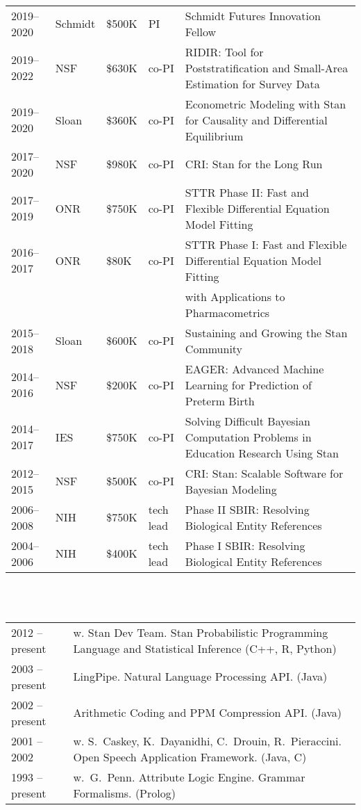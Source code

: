 \documentclass[10pt]{paper}
\newcommand{\heading}[1]{\noindent{\Large\bf\sffamily #1}\\[6pt]}
\newcommand{\publ}[2]{#1 & \begin{minipage}[t]{0.9\textwidth}#2\end{minipage}\\[4pt]}
\begin{document}
\heading{Grant Funding}
%
\begin{tabular}{lllll}
2019--2020 & Schmidt & \$500K & PI & Schmidt Futures Innovation Fellow
\\[3pt]
2019--2022 & NSF & \$630K & co-PI & RIDIR: Tool for Poststratification and
                            Small-Area Estimation for Survey Data
\\[3pt]
2019--2020 & Sloan & \$360K & co-PI & Econometric Modeling with Stan for
                                      Causality and Differential Equilibrium
\\[3pt]
2017--2020 & NSF & \$980K & co-PI & CRI: Stan for the Long Run
\\[3pt]
2017--2019 & ONR & \$750K & co-PI & STTR Phase II: Fast and Flexible
                                 Differential Equation Model Fitting
\\[3pt]
2016--2017 & ONR & \$80K & co-PI & STTR Phase I: Fast and Flexible
                                   Differential Equation Model Fitting
\\[1pt]
& & & &                                    with Applications to Pharmacometrics
\\[3pt]
2015--2018 & Sloan & \$600K & co-PI & Sustaining and Growing the Stan Community
\\[3pt]
2014--2016 & NSF & \$200K & co-PI & EAGER: Advanced Machine Learning
for Prediction of Preterm Birth
\\[3pt]
2014--2017 & IES & \$750K & co-PI & Solving Difficult Bayesian Computation Problems in Education Research Using Stan
\\[3pt]
2012--2015 & NSF & \$500K & co-PI & CRI: Stan: Scalable Software for
Bayesian Modeling
\\[3pt]
2006--2008 & NIH & \$750K & tech lead & Phase II SBIR: Resolving Biological Entity References
\\[3pt]
2004--2006 & NIH & \$400K & tech lead & Phase I SBIR: Resolving Biological Entity References
\end{tabular}
\\[10pt]

\heading{Open Source Software}
%
\begin{tabular}{ll}
\publ{2012 -- present}{w. Stan Dev Team.  Stan Probabilistic Programming Language and
  Statistical Inference (C++, R, Python)\vspace*{6pt}}
\publ{2003 -- present}{LingPipe. Natural Language Processing API. (Java)}
\publ{2002 -- present}{Arithmetic Coding and PPM Compression API. (Java)}
\publ{2001 -- 2002}{w. S.~Caskey, K.~Dayanidhi, C.~Drouin, R.~Pieraccini. Open Speech Application Framework. (Java, C)}
\publ{1993 -- present}{w.\ G.~Penn. Attribute Logic Engine. Grammar Formalisms. (Prolog)}
\end{tabular}
\\[8pt]
\end{document}
